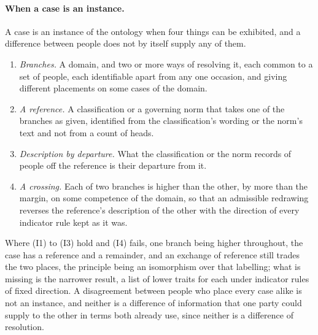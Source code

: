 \paragraph{When a case is an instance.} A case is an instance of the ontology when four things can be exhibited, and a difference between people does not by itself supply any of them.
\begin{enumerate}[label=(I\arabic*), leftmargin=*, nosep]
\item \emph{Branches.} A domain, and two or more ways of resolving it, each common to a set of people, each identifiable apart from any one occasion, and giving different placements on some cases of the domain.
\item \emph{A reference.} A classification or a governing norm that takes one of the branches as given, identified from the classification's wording or the norm's text and not from a count of heads.
\item \emph{Description by departure.} What the classification or the norm records of people off the reference is their departure from it.
\item \emph{A crossing.} Each of two branches is higher than the other, by more than the margin, on some competence of the domain, so that an admissible redrawing reverses the reference's description of the other with the direction of every indicator rule kept as it was.
\end{enumerate}
Where (I1) to (I3) hold and (I4) fails, one branch being higher throughout, the case has a reference and a remainder, and an exchange of reference still trades the two places, the principle being an isomorphism over that labelling; what is missing is the narrower result, a list of lower traits for each under indicator rules of fixed direction. A disagreement between people who place every case alike is not an instance, and neither is a difference of information that one party could supply to the other in terms both already use, since neither is a difference of resolution.

